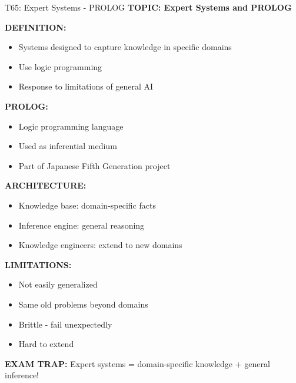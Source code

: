 \documentclass[8pt]{beamer}
\begin{document}
	\begin{frame}{T65: Expert Systems - PROLOG}
		\fontsize{6.5}{7.5}\selectfont
		\textbf{TOPIC: Expert Systems and PROLOG}
		
		\vspace{0.1cm}
		\textbf{DEFINITION:}
		\begin{itemize}
			\item Systems designed to capture knowledge in specific domains
			\item Use logic programming
			\item Response to limitations of general AI
		\end{itemize}
		
		\vspace{0.1cm}
		\textbf{PROLOG:}
		\begin{itemize}
			\item Logic programming language
			\item Used as inferential medium
			\item Part of Japanese Fifth Generation project
		\end{itemize}
		
		\vspace{0.1cm}
		\textbf{ARCHITECTURE:}
		\begin{itemize}
			\item Knowledge base: domain-specific facts
			\item Inference engine: general reasoning
			\item Knowledge engineers: extend to new domains
		\end{itemize}
		
		\vspace{0.1cm}
		\textbf{LIMITATIONS:}
		\begin{itemize}
			\item Not easily generalized
			\item Same old problems beyond domains
			\item Brittle - fail unexpectedly
			\item Hard to extend
		\end{itemize}
		
		\textcolor{myred}{\textbf{EXAM TRAP:}} Expert systems = \textcolor{myblue}{domain-specific knowledge + general inference}!
	\end{frame}
	
\end{document}

